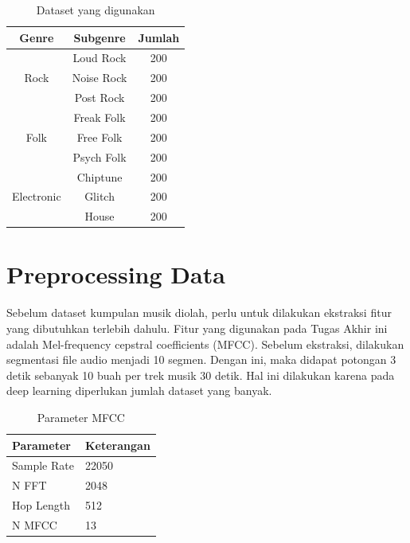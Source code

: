 \begin{table}[h]
	\centering
	
	\caption{Dataset yang digunakan}
	
	\begin{tabular}{|c|c|c|}
		\hline
		\textbf{Genre}              & \textbf{Subgenre} & \textbf{Jumlah} \\ \hline
		\multirow{3}{*}{Rock}       & Loud Rock         & 200             \\ \cline{2-3} 
		& Noise Rock        & 200             \\ \cline{2-3} 
		& Post Rock         & 200             \\ \hline
		\multirow{3}{*}{Folk}       & Freak Folk        & 200             \\ \cline{2-3} 
		& Free Folk         & 200             \\ \cline{2-3} 
		& Psych Folk        & 200             \\ \hline
		\multirow{3}{*}{Electronic} & Chiptune          & 200             \\ \cline{2-3} 
		& Glitch            & 200             \\ \cline{2-3} 
		& House             & 200             \\ \hline
	\end{tabular}
	
	\label{fig:dataset}
\end{table}

\section{Preprocessing Data}
\label{sec:preprocessing}

Sebelum dataset kumpulan musik diolah, perlu untuk dilakukan ekstraksi fitur yang dibutuhkan terlebih dahulu. Fitur yang digunakan pada Tugas Akhir ini adalah Mel-frequency cepstral coefficients (MFCC). Sebelum ekstraksi, dilakukan segmentasi file audio menjadi 10 segmen. Dengan ini, maka didapat potongan 3 detik sebanyak 10 buah per trek musik 30 detik. Hal ini dilakukan karena pada deep learning diperlukan jumlah dataset yang banyak. 

\begin{table}[h]
	
	\centering
	
	\caption{Parameter MFCC}
	
	\begin{tabular}{|l|l|}
		\hline
		\textbf{Parameter} & \textbf{Keterangan} \\ \hline
		Sample Rate        & 22050               \\ \hline
		N FFT              & 2048                \\ \hline
		Hop Length         & 512                 \\ \hline
		N MFCC             & 13                  \\ \hline
	\end{tabular}

	\label{fig:mfccparameter}
\end{table}

